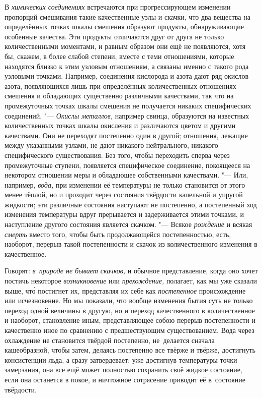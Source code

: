 В {\em химических соединениях} встречаются при прогрессирующем изменении
пропорций смешивания такие качественные узлы и скачки, что два вещества на
определённых точках шкалы смешения образуют продукты, обнаруживающие особенные
качества. Эти продукты отличаются друг от друга не только количественными
моментами, и равным образом они ещё не появляются, хотя бы, скажем, в более
слабой степени, вместе с теми отношениями, которые находятся близко к этим
узловым отношениям, а связаны именно с такого рода узловыми точками. Например,
соединения кислорода и азота дают ряд окислов азота, появляющихся лишь при
определённых количественных отношениях смешения и обладающих существенно
различными качествами, так что на промежуточных точках шкалы смешения не
получается никаких специфических соединений. "--- {\em Окислы металлов,}
например свинца, образуются на известных количественных точках шкалы окисления
и различаются цветом и другими качествами. Они не переходят постепенно один в
другой; отношения, лежащие между указанными узлами, не дают никакого
нейтрального, никакого специфического существования. Без того, чтобы переходить
сперва через промежуточные ступени, появляется специфическое соединение,
покоящееся на некотором отношении меры и обладающее собственными качествами.
"--- Или, например, {\em вода,} при изменении её температуры не только
становится от этого менее тёплой, но и проходит через состояния твёрдости
капельной и упругой жидкости; эти различные состояния наступают не постепенно,
а постепенный ход изменения температуры вдруг прерывается и задерживается этими
точками, и наступление другого состояния является скачком. "--- Всякое
{\em рождение} и всякая {\em смерть} вместо того, чтобы быть продолжающейся
постепенностью, есть, наоборот, перерыв такой постепенности и скачок из
количественного изменения в качественное.

Говорят: {\em в~природе не бывает скачков,} и обычное представление, когда оно
хочет постичь некоторое {\em возникновение} или {\em прехождение,} полагает,
как мы уже сказали выше, чт\'{о} постигнет их, представляя их себе как
{\em постепенное} происхождение или исчезновение. Но мы показали, что вообще
изменения бытия суть не только переход одной величины в другую, но и переход
качественного в количественное и наоборот, становление иным, представляющее
собою перерыв постепенности и качественно иное по сравнению с предшествующим
существованием. Вода через охлаждение не становится твёрдой постепенно,
не~делается сначала кашеобразной, чтобы затем, делаясь постепенно все твёрже и
твёрже, достигнуть консистенции льда, а сразу затвердевает; уже достигнув
температуры точки замерзания, она все ещё может полностью сохранить своё жидкое
состояние, если она останется в покое, и ничтожное сотрясение приводит её
в~состояние твёрдости.

